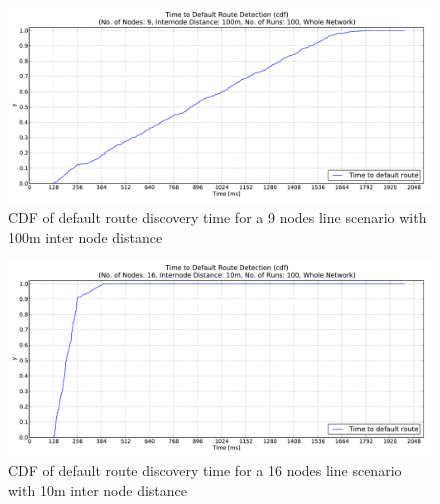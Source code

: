 \begin{figure}[htbp]
  \begin{center}
    \leavevmode
      \includegraphics[width=\textwidth]
      {Pics/results/9/MRHOF/line/dist100_montecarlo_cdf_hist.pdf}
   \caption{CDF of default route discovery time for a 9 nodes line scenario with 100m inter node distance}
   \label{fig:9_MRHOF_line100_cdf}
  \end{center}
\end{figure}


\begin{figure}[htbp]
  \begin{center}
    \leavevmode
      \includegraphics[width=\textwidth]
      {Pics/results/16/MRHOF/line/dist10_montecarlo_cdf_hist.pdf}
   \caption{CDF of default route discovery time for a 16 nodes line scenario with 10m inter node distance}
   \label{fig:16_MRHOF_line_10_cdf}
  \end{center}
\end{figure}

